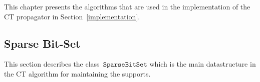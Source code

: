 \documentclass[a4paper,11pt]{article}
\newcommand{\Chapref}[1]{Section~\ref{#1}}
\newcommand{\SparseBitSet}{\texttt{SparseBitSet}}
\begin{document}

This chapter presents the algorithms that are used in the implementation of the
CT propagator in \Chapref{implementation}.

\subsection{Sparse Bit-Set}
This section describes the class~$\SparseBitSet$ which is the main datastructure
in the CT algorithm for maintaining the supports.
\end{document}
